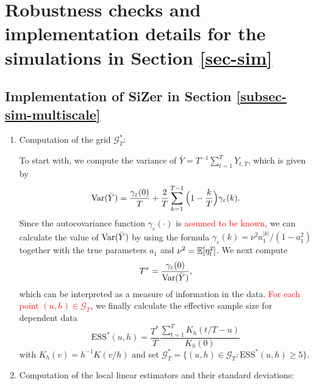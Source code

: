 
\section{Robustness checks and implementation details for the simulations in Section \ref{sec-sim}}\label{sec-supp-sim}


\subsection*{Implementation of SiZer in Section \ref{subsec-sim-multiscale}}


\begin{enumerate}[leftmargin=0.7cm,label=(\alph*)]

\item Computation of the grid $\mathcal{G}_T^*$:

To start with, we compute the variance of $\bar{Y} = T^{-1} \sum_{t=1}^T Y_{t,T}$, which is given by
\[ \textnormal{Var}(\bar{Y}) = \frac{\gamma_\varepsilon(0)}{T} + \frac{2}{T} \sum_{k = 1}^{T-1} \Big(1 - \frac{k}{T}\Big)\gamma_\varepsilon(k). \]
Since the autocovariance function $\gamma_{\varepsilon}(\cdot)$ is \textcolor{red}{assumed to be known}, we can calculate the value of $\textnormal{Var}(\bar{Y})$ by using the formula $\gamma_\varepsilon(k) = \nu^2 a_1^{|k|} / (1 - a_1^2)$ together with the true para\-meters $a_1$ and $\nu^2 = \mathbb{E}[\eta_t^2]$. We next compute 
\[ T^* = \frac{\gamma_\varepsilon(0)}{\textnormal{Var}(\bar{Y})}, \] 
which can be interpreted as a measure of information in the data. \textcolor{red}{For each point $(u,h) \in \mathcal{G}_T$}, we finally calculate the effective sample size for dependent data 
\[ \text{ESS}^*(u, h) = \frac{T^*}{T} \frac{\sum_{t=1}^T K_h(t/T - u)}{K_h(0)} \]
with $K_h(v) = h^{-1} K(v/h)$ and set $\mathcal{G}_T^* = \{ (u,h) \in \mathcal{G}_T: \text{ESS}^*(u, h) \ge 5 \}$. 

\item Computation of the local linear estimators and their standard deviations: 


\end{enumerate}

